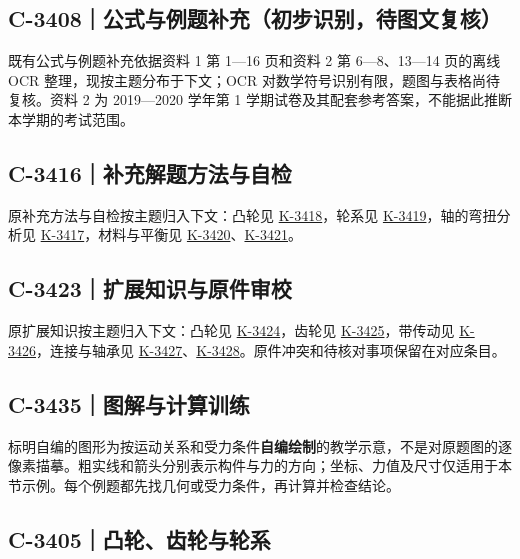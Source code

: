 \documentclass[zihao=5,a4paper,UTF8,fontset=fandol]{ctexart}
\begin{document}
\subsection{C-3408｜公式与例题补充（初步识别，待图文复核）}
\label{c-3408}

既有公式与例题补充依据资料 1 第 1—16 页和资料 2 第 6—8、13—14 页的离线 OCR 整理，现按主题分布于下文；OCR 对数学符号识别有限，题图与表格尚待复核。资料 2 为 2019—2020 学年第 1 学期试卷及其配套参考答案，不能据此推断本学期的考试范围。





\subsection{C-3416｜补充解题方法与自检}
\label{c-3416}

原补充方法与自检按主题归入下文：凸轮见 \hyperref[k-3418]{K-3418}，轮系见 \hyperref[k-3419]{K-3419}，轴的弯扭分析见 \hyperref[k-3417]{K-3417}，材料与平衡见 \hyperref[k-3420]{K-3420}、\hyperref[k-3421]{K-3421}。





\subsection{C-3423｜扩展知识与原件审校}
\label{c-3423}

原扩展知识按主题归入下文：凸轮见 \hyperref[k-3424]{K-3424}，齿轮见 \hyperref[k-3425]{K-3425}，带传动见 \hyperref[k-3426]{K-3426}，连接与轴承见 \hyperref[k-3427]{K-3427}、\hyperref[k-3428]{K-3428}。原件冲突和待核对事项保留在对应条目。





\subsection{C-3435｜图解与计算训练}
\label{c-3435}

标明自编的图形为按运动关系和受力条件\textbf{自编绘制}的教学示意，不是对原题图的逐像素描摹。粗实线和箭头分别表示构件与力的方向；坐标、力值及尺寸仅适用于本节示例。每个例题都先找几何或受力条件，再计算并检查结论。





\subsection{C-3405｜凸轮、齿轮与轮系}
\label{c-3405}
\end{document}
